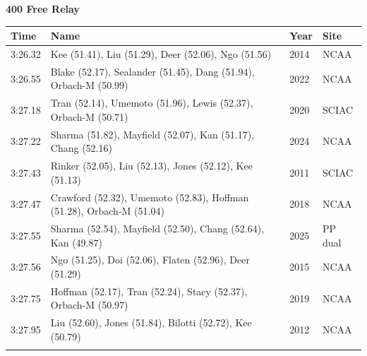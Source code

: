 \noindent\begin{minipage}[t]{0.98\textwidth}
\centering
\textbf{\textcolor{teamprimary}{400 Free Relay}}\par
\vspace{0.5em}
\centering
\small
\renewcommand{\arraystretch}{1.0}
\setlength{\tabcolsep}{4pt}
\begin{tabular}{@{}p{2.7cm}p{4.3cm}p{1.6cm}p{2.7cm}@{}}
\toprule
\textbf{Time} & \textbf{Name} & \textbf{Year} & \textbf{Site} \\
\midrule
3:26.32 & Kee (51.41), Liu (51.29), Deer (52.06), Ngo (51.56) & 2014 & NCAA \\
3:26.55 & Blake (52.17), Sealander (51.45), Dang (51.94), Orbach-M (50.99) & 2022 & NCAA \\
3:27.18 & Tran (52.14), Umemoto (51.96), Lewis (52.37), Orbach-M (50.71) & 2020 & SCIAC \\
3:27.22 & Sharma (51.82), Mayfield (52.07), Kan (51.17), Chang (52.16) & 2024 & NCAA \\
3:27.43 & Rinker (52.05), Liu (52.13), Jones (52.12), Kee (51.13) & 2011 & SCIAC \\
3:27.47 & Crawford (52.32), Umemoto (52.83), Hoffman (51.28), Orbach-M (51.04) & 2018 & NCAA \\
3:27.55 & Sharma (52.54), Mayfield (52.50), Chang (52.64), Kan (49.87) & 2025 & PP dual \\
3:27.56 & Ngo (51.25), Doi (52.06), Flaten (52.96), Deer (51.29) & 2015 & NCAA \\
3:27.75 & Hoffman (52.17), Tran (52.24), Stacy (52.37), Orbach-M (50.97) & 2019 & NCAA \\
3:27.95 & Liu (52.60), Jones (51.84), Bilotti (52.72), Kee (50.79) & 2012 & NCAA \\
\bottomrule
\vspace{0.5em}
\end{tabular}
\end{minipage}
\vspace{1.2em}
